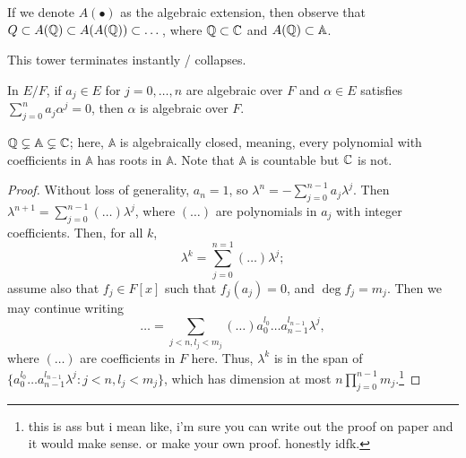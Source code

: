 If we denote $A(\bullet)$ as the algebraic extension, then observe that $Q \subset A(\mathbb Q) \subset A(A(\mathbb Q)) \subset \dots$, where $\mathbb Q \subset \mathbb C$ and $A(\mathbb Q) \subset \mathbb{A}$.
\begin{theorem}
    This tower terminates instantly / collapses.
\end{theorem}
\begin{theorem}
    In $E/F$, if $a_j \in E$ for $j = 0, \dots, n$ are algebraic over $F$ and $\alpha \in E$ satisfies $\sum_{j=0}^n a_j \alpha^j = 0$, then $\alpha$ is algebraic over $F$.
\end{theorem}
\begin{corollary}
    $\mathbb Q \subsetneq \mathbb{A} \subsetneq \mathbb C$; here, $\mathbb{A}$ is algebraically closed, meaning, every polynomial with coefficients in $\mathbb{A}$ has roots in $\mathbb{A}$. Note that $\mathbb{A}$ is countable but $\mathbb C$ is not.
\end{corollary}
\begin{proof}
    Without loss of generality, $a_n = 1$, so $\lambda^n = -\sum_{j=0}^{n-1} a_j \lambda^j$. Then $\lambda^{n+1} = \sum_{j=0}^{n-1} (\dots) \lambda^j$, where $(\dots)$ are polynomials in $a_j$ with integer coefficients. Then, for all $k$,
    \[ \lambda^k = \sum_{j=0}^{n=1} (\dots) \lambda^j; \]
    assume also that $f_j \in F[x]$ such that $f_j(a_j) = 0$, and $\deg f_j = m_j$. Then we may continue writing
    \[ \dots = \sum_{j<n, l_j < m_j} (\dots) a_0^{l_0} \dots a_{n-1}^{l_{n-1}} \lambda^j, \]
    where $(\dots)$ are coefficients in $F$ here. Thus, $\lambda^k$ is in the span of $\{a_0^{l_0} \dots a_{n-1}^{l_{n-1}} \lambda^j : j < n, l_j < m_j\}$, which has dimension at most $n \prod_{j=0}^{n-1} m_j$.\footnote{this is ass but i mean like, i'm sure you can write out the proof on paper and it would make sense. or make your own proof. honestly idfk.}
\end{proof}